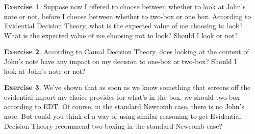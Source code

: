 \documentclass[11pt]{article}
\theoremstyle{definition}
\newtheorem{exer}{Exercise}
\begin{document}
\begin{exer}
Suppose now I offered to choose between whether to look at John's note or not, before I choose between whether to two-box or one box. According to Evidential Decision Theory, what is the expected value of me choosing to look? What is the expected value of me choosing not to look? Should I look or not?

\end{exer}


\begin{exer}
According to Causal Decision Theory, does looking at the content of John's note have any impact on my decision to one-box or two-box? Should I look at John's note or not?

\end{exer}


\begin{exer}
We've shown that as soon as we know something that screens off the evidential import my choice provides for what's in the box, we should two-box according to EDT. Of course, in the standard Newcomb case, there is no John's note. But could you think of a way of using similar reasoning to get Evidential Decision Theory recommend two-boxing in the standard Newcomb case?

\end{exer}
\end{document}
